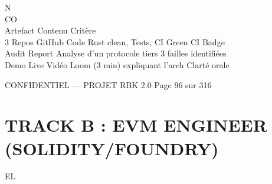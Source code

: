 N\\
CO\\
Artefact       Contenu                              Critère\\
3 Repos GitHub Code Rust clean, Tests, CI           Green CI Badge\\
Audit Report   Analyse d’un protocole tiers         3 failles identifiées\\
Demo Live      Vidéo Loom (3 min) expliquant l’arch Clarté orale\\
\vspace{0.5em}
\vspace{0.5em}
\vspace{0.5em}
\vspace{0.5em}
\begin{confidential}CONFIDENTIEL — PROJET RBK 2.0                                  Page 96 sur 316\end{confidential}
\section{TRACK B : EVM ENGINEER (SOLIDITY/FOUNDRY)}
\vspace{0.5em}
\vspace{0.5em}
\vspace{0.5em}
\vspace{0.5em}
EL\\

